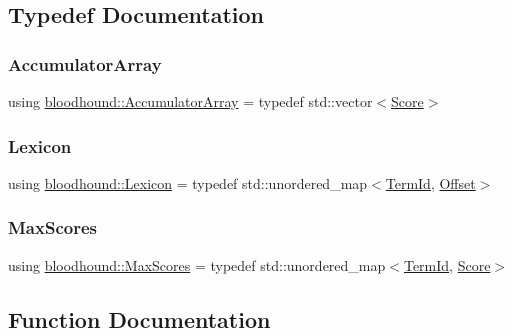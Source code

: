 \subsection{Typedef Documentation}
\mbox{\label{namespacebloodhound_ae863daa54e3092bd2bc335e70f7a9dd7}} 
\subsubsection{\texorpdfstring{Accumulator\+Array}{AccumulatorArray}}
{\footnotesize\ttfamily using \mbox{\hyperlink{namespacebloodhound_ae863daa54e3092bd2bc335e70f7a9dd7}{bloodhound\+::\+Accumulator\+Array}} = typedef std\+::vector$<$\mbox{\hyperlink{structbloodhound_1_1Score}{Score}}$>$}

\mbox{\label{namespacebloodhound_a94032a3533df0a1b6d3435bad57e6499}} 
\subsubsection{\texorpdfstring{Lexicon}{Lexicon}}
{\footnotesize\ttfamily using \mbox{\hyperlink{namespacebloodhound_a94032a3533df0a1b6d3435bad57e6499}{bloodhound\+::\+Lexicon}} = typedef std\+::unordered\+\_\+map$<$\mbox{\hyperlink{structbloodhound_1_1TermId}{Term\+Id}}, \mbox{\hyperlink{structbloodhound_1_1Offset}{Offset}}$>$}

\mbox{\label{namespacebloodhound_a687d80c6f992eba8b820bf30a482f4b4}} 
\subsubsection{\texorpdfstring{Max\+Scores}{MaxScores}}
{\footnotesize\ttfamily using \mbox{\hyperlink{namespacebloodhound_a687d80c6f992eba8b820bf30a482f4b4}{bloodhound\+::\+Max\+Scores}} = typedef std\+::unordered\+\_\+map$<$\mbox{\hyperlink{structbloodhound_1_1TermId}{Term\+Id}}, \mbox{\hyperlink{structbloodhound_1_1Score}{Score}}$>$}



\subsection{Function Documentation}
\mbox{\label{namespacebloodhound_a0ee8a7512bc2dea6326445fa8b7509b2}} 
